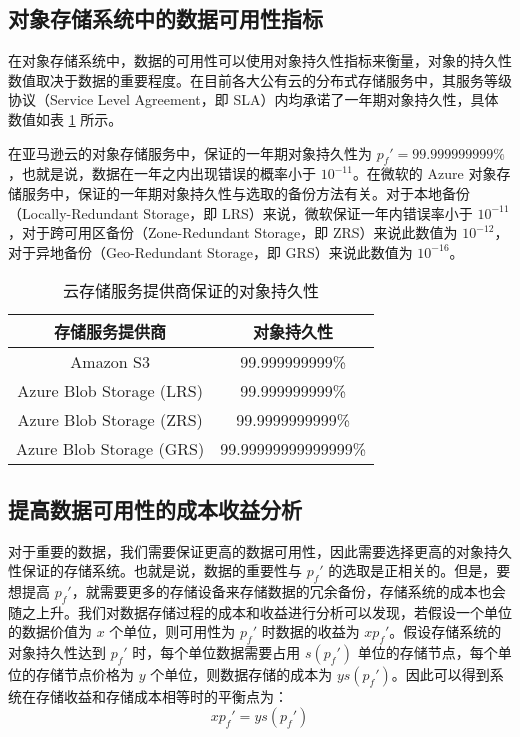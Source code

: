 \subsection{对象存储系统中的数据可用性指标}
在对象存储系统中，数据的可用性可以使用对象持久性指标来衡量，对象的持久性数值取决于数据的重要程度。在目前各大公有云的分布式存储服务中，其服务等级协议（Service Level Agreement，即 SLA）内均承诺了一年期对象持久性，具体数值如表 \ref{t1} 所示。

在亚马逊云的对象存储服务中，保证的一年期对象持久性为 $p_{f}'=99.999999999\%$，也就是说，数据在一年之内出现错误的概率小于 $10^{-11}$。在微软的 Azure 对象存储服务\cite{huang2012erasure}中，保证的一年期对象持久性与选取的备份方法有关。对于本地备份（Locally-Redundant Storage，即 LRS）来说，微软保证一年内错误率小于 $10^{-11}$，对于跨可用区备份（Zone-Redundant Storage，即 ZRS）来说此数值为 $10^{-12}$，对于异地备份（Geo-Redundant Storage，即 GRS）来说此数值为 $10^{-16}$。

\begin{table}[!htb]
\centering
\caption{云存储服务提供商保证的对象持久性}
\begin{tabular}{c|c}
\hline
存储服务提供商 & 对象持久性\\\hline
Amazon S3\cite{amazon2020amazon} & 99.999999999\%\\\hline
Azure Blob Storage (LRS)\cite{microsoft2020azure} & 99.999999999\%\\\hline
Azure Blob Storage (ZRS)\cite{microsoft2020azure} & 99.9999999999\%\\\hline
Azure Blob Storage (GRS)\cite{microsoft2020azure} & 99.99999999999999\%\\\hline
\end{tabular}
\label{t1}
\end{table}
\subsection{提高数据可用性的成本收益分析}
对于重要的数据，我们需要保证更高的数据可用性，因此需要选择更高的对象持久性保证的存储系统。也就是说，数据的重要性与 $p_{f}'$ 的选取是正相关的。但是，要想提高 $p_{f}'$，就需要更多的存储设备来存储数据的冗余备份，存储系统的成本也会随之上升。我们对数据存储过程的成本和收益进行分析可以发现，若假设一个单位的数据价值为 $x$ 个单位，则可用性为 $p_{f}'$ 时数据的收益为 $xp_{f}'$。假设存储系统的对象持久性达到 $p_{f}'$ 时，每个单位数据需要占用 $s(p_{f}')$ 单位的存储节点，每个单位的存储节点价格为 $y$ 个单位，则数据存储的成本为 $ys(p_{f}')$。因此可以得到系统在存储收益和存储成本相等时的平衡点为：
\begin{equation}
xp_{f}'=ys(p_{f}')
\end{equation}

